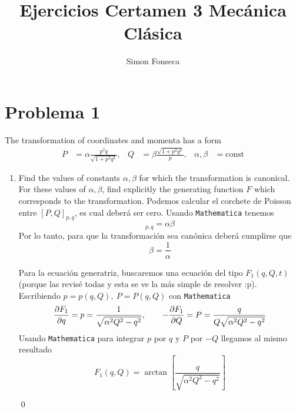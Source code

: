 \documentclass[]{article}
\title{Ejercicios Certamen 3 Mecánica Clásica}
\author{Simon Fonseca}
\numberwithin{equation}{section}
\begin{document}
\maketitle
\section{Problema 1}
The transformation of coordinates and momenta has a form
\begin{align}
	P &= \alpha\frac{p^2 q}{\sqrt{1 + p^{2}q^{2}}}, & Q &= \beta \frac{\sqrt{1 + p^2 q^2}}{p}, & \alpha, \beta &= \mathrm{const}
\end{align}
\begin{enumerate}
	\item[a.] Find the values of constants $\alpha, \beta$ for which the transformation is canonical. For these values of $\alpha, \beta$, find explicitly the generating function $F$ which corresponds to the transformation.
	\resp Podemos calcular el corchete de Poisson entre $[P,Q]_{p,q}$, es cual deberá ser cero. Usando \texttt{Mathematica} tenemos
	\begin{equation}
		[P,Q]_{p,q} = \alpha\beta
	\end{equation}
	Por lo tanto, para que la transformación sea canónica deberá cumplirse que
	\begin{equation}
		\beta = \frac{1}{\alpha}
	\end{equation}
	
	Para la ecuación generatriz, buscaremos una ecuación del tipo $F_1(q,Q,t)$ (porque las revisé todas y esta se ve la más simple de resolver :p). Escribiendo $p = p(q,Q), ~ P = P(q,Q)$ con \texttt{Mathematica}
	\begin{equation}
		\dfrac{\partial F_1}{\partial q} = p = \frac{1}{\sqrt{\alpha ^2 Q^2 - q^2}}, \qquad -\dfrac{\partial F_1}{\partial Q} = P = \frac{q}{Q \sqrt{\alpha ^2 Q^2 - q^2}}
	\end{equation}
	Usando \texttt{Mathematica} para integrar $p$ por $q$ y $P$ por $-Q$ llegamos al mismo resultado
	\begin{equation}
		F_1(q,Q) = \arctan\left[\frac{q}{\sqrt{\alpha ^2 Q^2-q^2}}\right]
	\end{equation}
	
	\qed
	

\end{enumerate}
\end{document}
